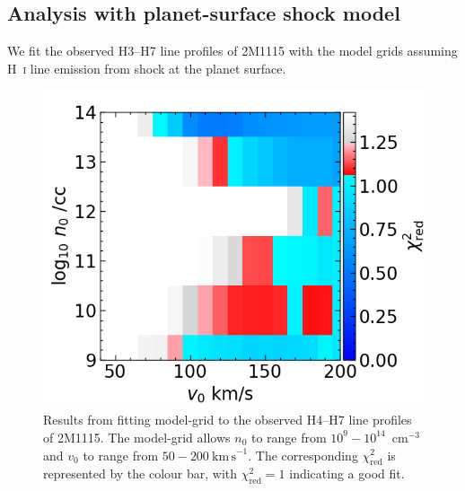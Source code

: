 \documentclass{aa}
\newcommand{\Hi}{H~\textsc{i}\xspace}
\newcommand{\kms}{\ensuremath{\mathrm{km\,s}^{-1}}\xspace}
\begin{document}
\begin{appendix}
\section{Analysis with planet-surface shock model} \label{shockmodel}
We fit the observed H3--H7 line profiles of 2M1115 with the \cite{aoyama2020, aoyama2021} model grids assuming \Hi line emission from shock at the planet surface.
\begin{figure}[!hb]
    \centering
    \includegraphics[width=1\linewidth]{RedChi2_2m1115_HbHgH6H7.png}
    \caption{ Results from fitting \cite{aoyama2020, aoyama2021} model-grid to the observed H4--H7 line profiles of 2M1115. The model-grid allows $n_0$ to range from $10^9-10^{14}$~cm$^{-3}$ and $v_0$ to range from $50-200~\kms$. The corresponding $\chi_\mathrm{red}^2$ is represented by the colour bar, with $\chi_\mathrm{red}^2=1$ indicating a good fit.}
    \label{apfig3}
\end{figure}


\end{appendix}
\end{document}
